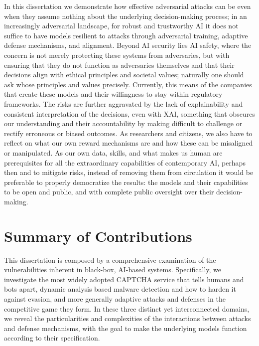 In this dissertation we demonstrate how effective adversarial attacks can be even when they assume nothing about the underlying decision-making process; in an increasingly adversarial landscape, for robust and trustworthy \gls{AI} it does not suffice to have models resilient to attacks through adversarial training, adaptive defense mechanisms, and alignment.
Beyond AI security lies AI safety, where the concern is not merely protecting these systems from adversaries, but with ensuring that they do not function as adversaries themselves and that their decisions align with ethical principles and societal values; naturally one should ask whose principles and values precisely.
Currently, this means of the companies that create these models and their willingness to stay within  regulatory frameworks.
The risks are further aggravated by the lack of explainability and consistent interpretation of the decisions, even with \gls{XAI}, something that obscures our understanding and their accountability by making difficult to challenge or rectify erroneous or biased outcomes.
As researchers and citizens, we also have to reflect on what our own reward mechanisms are and how these can be misaligned or manipulated.
As our own data, skills, and what makes us human are prerequisites for all the extraordinary capabilities of contemporary \gls{AI}, perhaps then and to mitigate risks, instead of removing them from circulation it would be preferable to properly democratize the results: the models and their capabilities to be open and public, and with complete public oversight over their decision-making.

\section{Summary of Contributions}
This dissertation is composed by a comprehensive examination of the vulnerabilities inherent in black-box, AI-based systems.
Specifically, we investigate the most widely adopted CAPTCHA service that tells humans and bots apart, dynamic analysis based malware detection and how to harden it against evasion, and more generally adaptive attacks and defenses in the competitive game they form.
In these three distinct yet interconnected domains, we reveal the particularities and complexities of the interactions between attacks and defense mechanisms, with the goal to make the underlying models function according to their specification.

